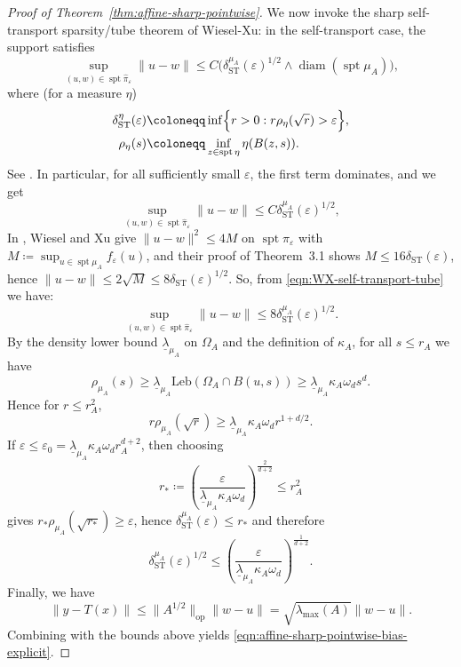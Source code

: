 \documentclass{article}
\theoremstyle{plain}
\theoremstyle{definition}
\theoremstyle{remark}
\numberwithin{equation}{section}
\DeclareMathOperator{\spt}{spt}
\DeclareMathOperator{\diam}{diam}
\newcommand{\Leb}{\mathrm{Leb}}
\begin{document}
\begin{proof}[Proof of Theorem~\ref{thm:affine-sharp-pointwise}]
We now invoke the sharp self-transport sparsity/tube theorem of Wiesel-Xu: in the self-transport case, the support satisfies
$$
\sup_{(u,w)\in\spt\widehat\pi_\varepsilon}\|u-w\|\le C\bigl(\delta_{\mathrm{ST}}^{\mu_A}(\varepsilon)^{1/2}\wedge\diam(\spt\mu_A)\bigr),
$$
where (for a measure $\eta$)
$$
\begin{aligned}
\delta_{\mathrm{ST}}^\eta(\varepsilon)&\coloneqq\inf\Bigl\{r>0:r\rho_\eta(\sqrt r)>\varepsilon\Bigr\},\\
\rho_\eta(s)&\coloneqq\inf_{z\in\spt\eta}\eta(B(z,s)).
\end{aligned}
$$
See \citealp[Theorem~3.1,~3.4]{wiesel2025sparsity}.
In particular, for all sufficiently small $\varepsilon$, the first term dominates, and we get
\begin{equation}\label{eqn:WX-self-transport-tube}
\sup_{(u,w)\in\spt\widehat\pi_\varepsilon}\|u-w\|\le C\delta_{\mathrm{ST}}^{\mu_A}(\varepsilon)^{1/2},
\end{equation}
In \citealp[Lemma~3.5]{wiesel2025sparsity}, Wiesel and Xu give $\|u-w\|^2\le4M$ on $\spt\pi_\varepsilon$ with $M\coloneqq\sup_{u\in\spt\mu_A}f_\varepsilon(u)$, and their proof of Theorem~3.1 shows $M\le 16\delta_{\mathrm{ST}}(\varepsilon)$, hence $\|u-w\|\le 2\sqrt M\le 8\delta_{\mathrm{ST}}(\varepsilon)^{1/2}$.
So, from \eqref{eqn:WX-self-transport-tube} we have:
\[
\sup_{(u,w)\in\spt\widehat\pi_\varepsilon}\|u-w\|\le 8\delta_{\mathrm{ST}}^{\mu_A}(\varepsilon)^{1/2}. 
\]
By the density lower bound $\underline\lambda_{\mu_A}$ on $\Omega_A$ and the definition of $\kappa_A$, for all $s\le r_A$ we have
$$
\rho_{\mu_A}(s)\ge\underline\lambda_{\mu_A}\Leb(\Omega_A\cap B(u,s))\ge\underline\lambda_{\mu_A}\kappa_A\omega_ds^d.
$$
Hence for $r\le r_A^2$,
$$
r\rho_{\mu_A}(\sqrt r)\ge\underline\lambda_{\mu_A}\kappa_A\omega_dr^{1+d/2}.
$$
If $\varepsilon\le\varepsilon_0=\underline\lambda_{\mu_A}\kappa_A\omega_dr_A^{d+2}$, then choosing
$$
r_*\coloneqq\left(\frac{\varepsilon}{\underline\lambda_{\mu_A}\kappa_A\omega_d}\right)^{\frac{2}{d+2}}\le r_A^2
$$
gives $r_*\rho_{\mu_A}(\sqrt{r_*})\ge\varepsilon$, hence $\delta_{\mathrm{ST}}^{\mu_A}(\varepsilon)\le r_*$ and therefore
$$
\delta_{\mathrm{ST}}^{\mu_A}(\varepsilon)^{1/2}\le\left(\frac{\varepsilon}{\underline\lambda_{\mu_A}\kappa_A\omega_d}\right)^{\frac{1}{d+2}}.
$$
Finally, we have 
$$
\|y-T(x)\|\le\|A^{1/2}\|_{\mathrm{op}}\|w-u\|=\sqrt{\lambda_{\max}(A)}\|w-u\|.
$$
Combining with the bounds above yields \eqref{eqn:affine-sharp-pointwise-bias-explicit}.
\end{proof}
\end{document}
